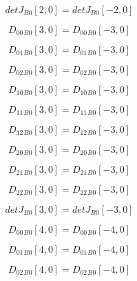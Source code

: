 \documentclass{article}
\begin{document}
\begin{dmath}{detJ{_{B0}}}[{2,0}] = {detJ{_{B0}}}[{-2,0}]\end{dmath}

\begin{dmath}{D_{00}{_{B0}}}[{3,0}] = {D_{00}{_{B0}}}[{-3,0}]\end{dmath}

\begin{dmath}{D_{01}{_{B0}}}[{3,0}] = {D_{01}{_{B0}}}[{-3,0}]\end{dmath}

\begin{dmath}{D_{02}{_{B0}}}[{3,0}] = {D_{02}{_{B0}}}[{-3,0}]\end{dmath}

\begin{dmath}{D_{10}{_{B0}}}[{3,0}] = {D_{10}{_{B0}}}[{-3,0}]\end{dmath}

\begin{dmath}{D_{11}{_{B0}}}[{3,0}] = {D_{11}{_{B0}}}[{-3,0}]\end{dmath}

\begin{dmath}{D_{12}{_{B0}}}[{3,0}] = {D_{12}{_{B0}}}[{-3,0}]\end{dmath}

\begin{dmath}{D_{20}{_{B0}}}[{3,0}] = {D_{20}{_{B0}}}[{-3,0}]\end{dmath}

\begin{dmath}{D_{21}{_{B0}}}[{3,0}] = {D_{21}{_{B0}}}[{-3,0}]\end{dmath}

\begin{dmath}{D_{22}{_{B0}}}[{3,0}] = {D_{22}{_{B0}}}[{-3,0}]\end{dmath}

\begin{dmath}{detJ{_{B0}}}[{3,0}] = {detJ{_{B0}}}[{-3,0}]\end{dmath}

\begin{dmath}{D_{00}{_{B0}}}[{4,0}] = {D_{00}{_{B0}}}[{-4,0}]\end{dmath}

\begin{dmath}{D_{01}{_{B0}}}[{4,0}] = {D_{01}{_{B0}}}[{-4,0}]\end{dmath}

\begin{dmath}{D_{02}{_{B0}}}[{4,0}] = {D_{02}{_{B0}}}[{-4,0}]\end{dmath}
\end{document}
